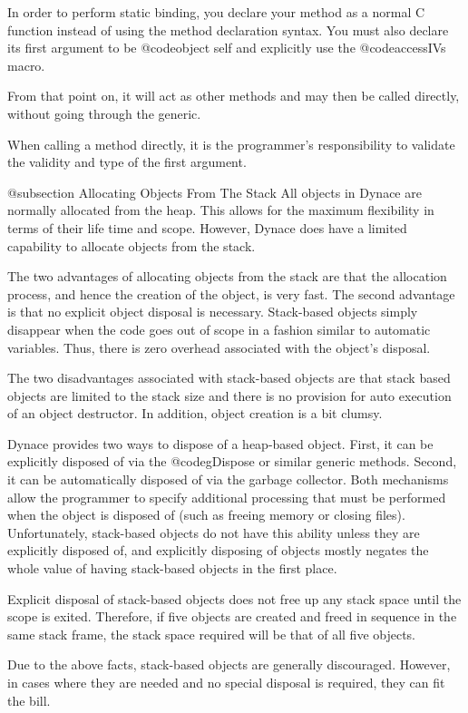 In order to perform static binding, you declare your method as a normal
C function instead of using the method declaration syntax.  You must
also declare its first argument to be @code{object self} and explicitly use
the @code{accessIVs} macro.

From that point on, it will act as other methods and may then be called
directly, without going through the generic.


When calling a method directly, it is the programmer's responsibility to
validate the validity and type of the first argument.


@subsection Allocating Objects From The Stack
All objects in Dynace are normally allocated from the heap.  This
allows for the maximum flexibility in terms of their life time
and scope.  However, Dynace does have a limited capability to
allocate objects from the stack.

The two advantages of allocating objects from the stack are that
the allocation process, and hence the creation of the object, is very
fast.  The second advantage is that no explicit object disposal is
necessary. Stack-based objects simply disappear when the code goes
out of scope in a fashion similar to automatic variables.  Thus,
there is zero overhead associated with the object's disposal.

The two disadvantages associated with stack-based objects are that stack
based objects are limited to the stack size and there is no provision
for auto execution of an object destructor.  In addition, object
creation is a bit clumsy.

Dynace provides two ways to dispose of a heap-based object.  First, it
can be explicitly disposed of via the @code{gDispose} or similar generic methods.
Second, it can be automatically disposed of via the garbage collector.
Both mechanisms allow the programmer to specify additional processing
that must be performed when the object is disposed of (such as freeing
memory or closing files).  Unfortunately, stack-based objects do not have
this ability unless they are explicitly disposed of, and explicitly disposing
of objects mostly negates the whole value of having stack-based objects
in the first place.

Explicit disposal of stack-based objects does not free up any stack
space until the scope is exited.  Therefore, if five objects are created
and freed in sequence in the same stack frame, the stack space required
will be that of all five objects.

Due to the above facts, stack-based objects are generally discouraged.
However, in cases where they are needed and no special disposal
is required, they can fit the bill.

